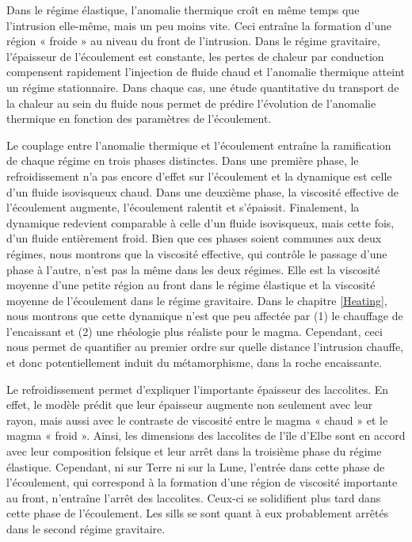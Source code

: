 Dans le régime élastique, l’anomalie thermique croît en même temps que
l’intrusion elle-même, mais un peu moins vite. Ceci entraîne la
formation d’une région « froide » au niveau du front de
l’intrusion. Dans le régime gravitaire, l’épaisseur de l’écoulement
est constante, les pertes de chaleur par conduction compensent
rapidement l’injection de fluide chaud et l’anomalie thermique atteint
un régime stationnaire. Dans chaque cas, une étude quantitative du
transport de la chaleur au sein du fluide nous permet de prédire
l’évolution de l’anomalie thermique en fonction des paramètres de
l’écoulement.

Le couplage entre l'anomalie thermique et l'écoulement entraîne la
ramification de chaque régime en trois phases distinctes. Dans une
première phase, le refroidissement n'a pas encore d'effet sur
l'écoulement et la dynamique est celle d'un fluide isovisqueux chaud.
Dans une deuxième phase, la viscosité effective de l'écoulement
augmente, l’écoulement ralentit et s’épaissit. Finalement, la
dynamique redevient comparable à celle d'un fluide isovisqueux, mais
cette fois, d'un fluide entièrement froid. Bien que ces phases soient
communes aux deux régimes, nous montrons que la viscosité effective,
qui contrôle le passage d'une phase à l'autre, n’est pas la même dans
les deux régimes. Elle est la viscosité moyenne d’une petite région
au front dans le régime élastique et la viscosité moyenne de
l’écoulement dans le régime gravitaire. Dans le chapitre
\ref{Heating}, nous montrons que cette dynamique n’est que peu
affectée par (1) le chauffage de l’encaissant et (2) une rhéologie
plus réaliste pour le magma. Cependant, ceci nous permet de quantifier
au premier ordre sur quelle distance l'intrusion chauffe, et donc
potentiellement induit du métamorphisme, dans la roche encaissante.

Le  refroidissement  permet  d'expliquer  l'importante  épaisseur  des
laccolites. En effet, le modèle prédit que leur épaisseur augmente non
seulement avec leur  rayon, mais aussi avec le  contraste de viscosité
entre le magma « chaud » et  le magma « froid ». Ainsi, les dimensions
des laccolites  de l’île d’Elbe  sont en accord avec  leur composition
felsique   et  leur   arrêt  dans   la  troisième   phase  du   régime
élastique. Cependant, ni sur Terre ni sur la Lune, l'entrée dans cette
phase de l'écoulement,  qui correspond à la formation  d’une région de
viscosité    importante    au    front,   n’entraîne    l'arrêt    des
laccolites.  Ceux-ci se  solidifient  plus tard  dans  cette phase  de
l'écoulement. Les sills se sont  quant à eux probablement arrêtés dans
le second régime gravitaire.


